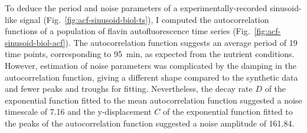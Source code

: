 To deduce the period and noise parameters of a experimentally-recorded sinusoid-like signal (Fig.\ \ref{fig:acf-sinusoid-biol-ts}), I computed the autocorrelation functions of a population of flavin autofluorescence time series (Fig.\ \ref{fig:acf-sinusoid-biol-acf}).
The autocorrelation function suggests an average period of 19 time points, corresponding to \SI{95}{\minute}, as expected from the nutrient conditions.
However, estimation of noise parameters was complicated by the damping in the autocorrelation function, giving a different shape compared to the synthetic data and fewer peaks and troughs for fitting.
Nevertheless, the decay rate $D$ of the exponential function fitted to the mean autocorrelation function suggested a noise timescale of 7.16 and the y-displacement $C$ of the exponential function fitted to the peaks of the autocorrelation function suggested a noise amplitude of 161.84.


